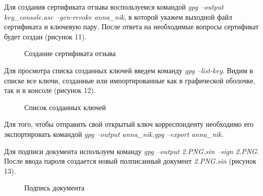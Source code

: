 \documentclass[10pt,a4paper]{report}
\begin{document}
Для создания сертификата отзыва воспользуемся командой \textit{gpg --output key\_console.asc  --gen-revoke anna\_nik}, в которой укажем выходной файл сертификата и ключевую пару. После ответа на необходимые вопросы сертификат будет создан (рисунок 11). \\
 \begin{figure}[h]
	\caption{Создание сертификата отзыва}
\end{figure}

 Для просмотра списка созданных ключей введем команду \textit{gpg --list-key}. Видим в списке все ключи, созданные или импортированные как в графической оболочке, так и в консоле (рисунок 12).
\begin{figure}[h]
	\caption{Список созданных ключей}
\end{figure}

Для того, чтобы отправить свой открытый ключ корреспонденту необходимо его экспортировать командой  \textit{gpg --output anna\_nik.gpg --export anna\_nik}.  

Для подписи документа используем команду \textit{gpg --output 2.PNG.sin --sign 2.PNG}. После ввода пароля создается новый полписанный документ \textit{2.PNG.sin} (рисунок 13).
\begin{figure}[h]
	\caption{Подпись документа}
\end{figure}
\end{document}
